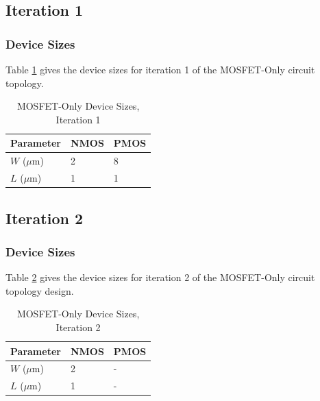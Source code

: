 \documentclass[conference]{IEEEtran}
\begin{document}
\subsection{Iteration 1}
\subsubsection{Device Sizes}
Table \ref{tab:mo-ds-1} gives the device sizes for iteration 1 of the MOSFET-Only circuit topology.
\begin{table}[!htbp]
  \caption[]{MOSFET-Only Device Sizes, Iteration 1}
  \label{tab:mo-ds-1}
  \centering
  \begin{tabular}{|l|l|l|}
    \hline
    Parameter			& NMOS	&PMOS \\ \hline
    $W$ ($\mu$m)		&2		&8\\ 
    $L$ ($\mu$m)		& 1		&1\\
    \hline
  \end{tabular}
\end{table}

\subsection{Iteration 2}
\subsubsection{Device Sizes}
Table \ref{tab:mo-ds-2} gives the device sizes for iteration 2 of the MOSFET-Only circuit topology design.
\begin{table}[!htbp]
  \caption[]{MOSFET-Only Device Sizes, Iteration 2}
  \label{tab:mo-ds-2}
  \centering
  \begin{tabular}{|l|l|l|}
    \hline
    Parameter			& NMOS	&PMOS \\ \hline
    $W$ ($\mu$m)		&2		&-\\ 
    $L$ ($\mu$m)		& 1		&-\\
    \hline
  \end{tabular}
\end{table}

\newpage
\end{document}

